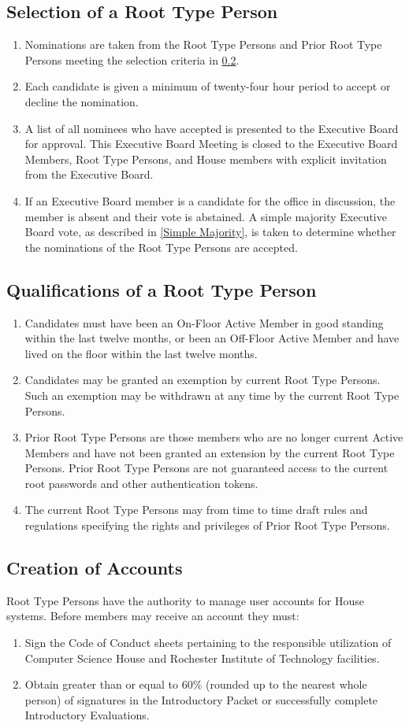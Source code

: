 \documentclass{article}
\newcommand{\bsection}[1]{\subsection{#1} \label{#1}}
\begin{document}
\bsection{Selection of a Root Type Person}
\renewcommand{\theenumi}{\alph{enumi}} %
\begin{enumerate}
	\item Nominations are taken from the Root Type Persons and Prior Root Type Persons meeting the selection criteria in \ref{Qualifications of a Root Type Person}.
	\item Each candidate is given a minimum of twenty-four hour period to accept or decline the nomination.
	\item A list of all nominees who have accepted is presented to the Executive Board for approval. This Executive Board Meeting is closed to the Executive Board Members, Root Type Persons, and House members with explicit invitation from the Executive Board.
	\item If an Executive Board member is a candidate for the office in discussion, the member is absent and their vote is abstained.
		A simple majority Executive Board vote, as described in \ref{Simple Majority}, is taken to determine whether the nominations of the Root Type Persons are accepted.
\end{enumerate}

\bsection{Qualifications of a Root Type Person}
\renewcommand{\theenumi}{\alph{enumi}} %
\begin{enumerate}
	\item Candidates must have been an On-Floor Active Member in good standing within the last twelve months, or been an Off-Floor Active Member and have lived on the floor within the last twelve months.
	\item Candidates may be granted an exemption by current Root Type Persons. Such an exemption may be withdrawn at any time by the current Root Type Persons.
	\item Prior Root Type Persons are those members who are no longer current Active Members and have not been granted an extension by the current Root Type Persons.
		Prior Root Type Persons are not guaranteed access to the current root passwords and other authentication tokens.
	\item The current Root Type Persons may from time to time draft rules and regulations specifying the rights and privileges of Prior Root Type Persons.
\end{enumerate}

\bsection{Creation of Accounts}
Root Type Persons have the authority to manage user accounts for House systems. Before members may receive an account they must:
\renewcommand{\theenumi}{\alph{enumi}} %
\begin{enumerate}
	\item Sign the Code of Conduct sheets pertaining to the responsible utilization of Computer Science House and Rochester Institute of Technology facilities.
	\item Obtain greater than or equal to 60\% (rounded up to the nearest whole person) of signatures in the Introductory Packet or successfully complete Introductory Evaluations.
\end{enumerate}
\end{document}
